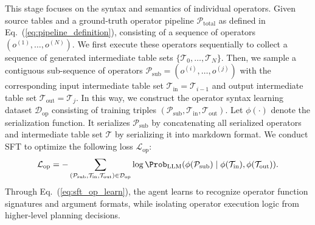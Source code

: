 This stage focuses on the syntax and semantics of individual operators.
Given source tables and a ground-truth operator pipeline $\mathcal{P}_{\text{total}}$ as defined in Eq.~(\ref{eq:pipeline_definition}), consisting of a sequence of operators $(o^{(1)}, \dots, o^{(N)})$. We first execute these operators sequentially to collect a sequence of generated intermediate table sets $\{\mathcal{T}_{0}, \dots, \mathcal{T}_{N}\}$.
Then, we sample a contiguous sub-sequence of operators $\mathcal{P}_{\text{sub}} = (o^{(i)}, \dots, o^{(j)})$ with the corresponding input intermediate table set $\mathcal{T}_{\text{in}}=\mathcal{T}_{i-1}$ and output intermediate table set $\mathcal{T}_{\text{out}}=\mathcal{T}_{j}$.
In this way, we construct the operator syntax learning dataset $\mathcal{D}_{\text{op}}$ consisting of training triples $(\mathcal{P}_{\text{sub}}, \mathcal{T}_{\text{in}}, \mathcal{T}_{\text{out}})$.
Let $\phi(\cdot)$ denote the serialization function. It serializes $\mathcal{P}_{\text{sub}}$ by concatenating all serialized operators and intermediate table set $\mathcal{T}$ by serializing it into markdown format. We conduct SFT to optimize the following loss $\mathcal{L}_{\text{op}}$:
%
\begin{equation}
\label{eq:sft_op_learn}
\mathcal{L}_{\text{op}} 
= - \sum_{(\mathcal{P}_{\text{sub}}, \mathcal{T}_{\text{in}}, \mathcal{T}_{\text{out}}) \in \mathcal{D}_{\text{op}}}
\log \Prob_{\text{LLM}}(
\phi(\mathcal{P}_{\text{sub}})
\mid 
\phi(\mathcal{T}_{\text{in}}), \phi(\mathcal{T}_{\text{out}})
).
\end{equation}
%
Through Eq.~(\ref{eq:sft_op_learn}), the agent learns to recognize operator function signatures and argument formats, while isolating operator execution logic from higher-level planning decisions.


